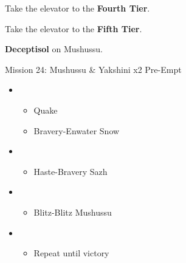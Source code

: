 \documentclass{report}
\begin{document}

Take the elevator to the \textbf{Fourth Tier}.

Take the elevator to the \textbf{Fifth Tier}.

\textbf{Deceptisol} on Mushussu.

\begin{battle}{Mission 24: Mushussu \& Yakshini x2 Pre-Empt}
\begin{itemize}
    \item \first
    \begin{itemize}
        \item Quake
        \item Bravery-Enwater Snow
    \end{itemize}
    \item \fifth
    \begin{itemize}
        \item Haste-Bravery Sazh
    \end{itemize}
    \item \fourth
    \begin{itemize}
        \item Blitz-Blitz Mushussu
    \end{itemize}
    \item \second
    \begin{itemize}
        \item Repeat until victory
    \end{itemize}
\end{itemize}
\end{battle}
\end{document}
